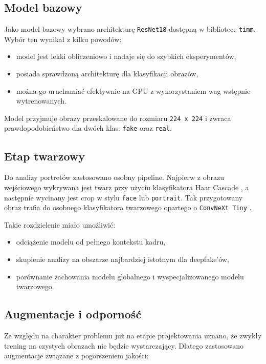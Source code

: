 \subsection{Model bazowy}

Jako model bazowy wybrano architekturę \texttt{ResNet18} \cite{he2016resnet} dostępną w bibliotece \texttt{timm}. Wybór ten wynikał z kilku powodów:

\begin{itemize}
    \item model jest lekki obliczeniowo i nadaje się do szybkich eksperymentów,
    \item posiada sprawdzoną architekturę dla klasyfikacji obrazów,
    \item można go uruchamiać efektywnie na GPU z wykorzystaniem wag wstępnie wytrenowanych.
\end{itemize}

Model przyjmuje obrazy przeskalowane do rozmiaru \texttt{224 x 224} i zwraca prawdopodobieństwo dla dwóch klas: \texttt{fake} oraz \texttt{real}.

\subsection{Etap twarzowy}

Do analizy portretów zastosowano osobny pipeline. Najpierw z obrazu wejściowego wykrywana jest twarz przy użyciu klasyfikatora Haar Cascade \cite{viola2001rapid}, a następnie wycinany jest crop w stylu \texttt{face} lub \texttt{portrait}. Tak przygotowany obraz trafia do osobnego klasyfikatora twarzowego opartego o \texttt{ConvNeXt Tiny} \cite{liu2022convnext}.

Takie rozdzielenie miało umożliwić:

\begin{itemize}
    \item odciążenie modelu od pełnego kontekstu kadru,
    \item skupienie analizy na obszarze najbardziej istotnym dla deepfake'ów,
    \item porównanie zachowania modelu globalnego i wyspecjalizowanego modelu twarzowego.
\end{itemize}

\subsection{Augmentacje i odporność}

Ze względu na charakter problemu już na etapie projektowania uznano, że zwykły trening na czystych obrazach nie będzie wystarczający. Dlatego zastosowano augmentacje związane z pogorszeniem jakości:

